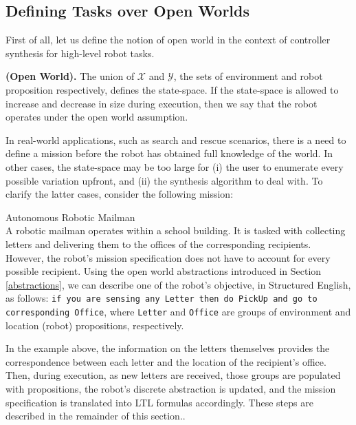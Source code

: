 \subsection{Defining Tasks over Open Worlds}

First of all, let us define the notion of open world in the context of controller synthesis for high-level robot tasks.

\begin{myDefinition}
	\textbf{(Open World).} The union of $\mathcal{X}$ and $\mathcal{Y}$, the sets of environment and robot proposition respectively, defines the state-space. If the state-space is allowed to increase and decrease in size during execution, then we say that the robot operates under the open world assumption.
\end{myDefinition}

In real-world applications, such as search and rescue scenarios, there is a need to define a mission before the robot has obtained full knowledge of the world. In other cases, the state-space may be too large for (i) the user to enumerate every possible variation upfront, and (ii) the synthesis algorithm to deal with. To clarify the latter cases, consider the following mission:

\begin{myExample}\label{Ex:mission1} Autonomous Robotic Mailman\\
	A robotic mailman operates within a school building. It is tasked with collecting letters and delivering them to the offices of the corresponding recipients. However, the robot's mission specification does not have to account for every possible recipient. Using the open world abstractions introduced in Section \ref{abstractions}, we can describe one of the robot's objective, in Structured English, as follows: 
\texttt{if you are sensing any Letter then do PickUp and go to corresponding Office}, where \texttt{Letter} and \texttt{Office} are groups of environment and location (robot) propositions, respectively.
\end{myExample}

In the example above, the information on the letters themselves provides the correspondence between each letter and the location of the recipient's office. Then, during execution, as new letters are received, those groups are populated with propositions, the robot's discrete abstraction is updated, and the mission specification is translated into LTL formulas accordingly. These steps are described in the remainder of this section..

